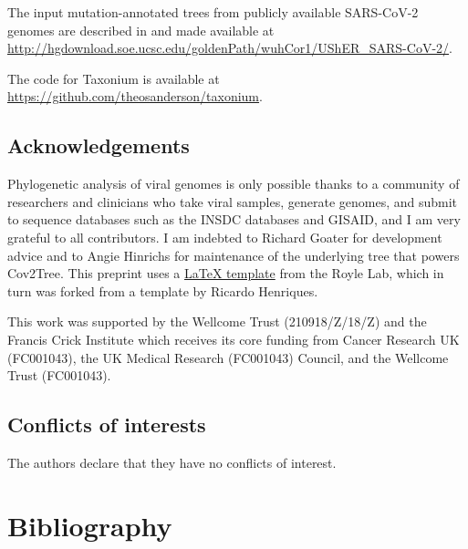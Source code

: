 \documentclass[twocolumn]{bioRxiv}
\begin{document}
The input mutation-annotated trees from publicly available SARS-CoV-2 genomes are described in \cite{McBroome2021} and made available at \url{http://hgdownload.soe.ucsc.edu/goldenPath/wuhCor1/UShER_SARS-CoV-2/}.

The code for Taxonium is available at \url{https://github.com/theosanderson/taxonium}.


\subsection*{Acknowledgements}

Phylogenetic analysis of viral genomes is only possible thanks to a community of researchers and clinicians who take viral samples, generate genomes, and submit to sequence databases such as the INSDC databases and GISAID, and I am very grateful to all contributors. I am indebted to Richard Goater for development advice and to Angie Hinrichs for maintenance of the underlying tree that powers Cov2Tree. This preprint uses a \href{https://github.com/roylelab/manuscript-templates}{LaTeX template} from the Royle Lab, which in turn was forked from a template by Ricardo Henriques.

This work was supported by the Wellcome Trust (210918/Z/18/Z) and the Francis Crick Institute which receives its core funding from Cancer Research UK (FC001043), the UK Medical Research (FC001043) Council, and the Wellcome Trust (FC001043).


\subsection*{Conflicts of interests}
The authors declare that they have no conflicts of interest.



\section*{Bibliography}




\end{document}
